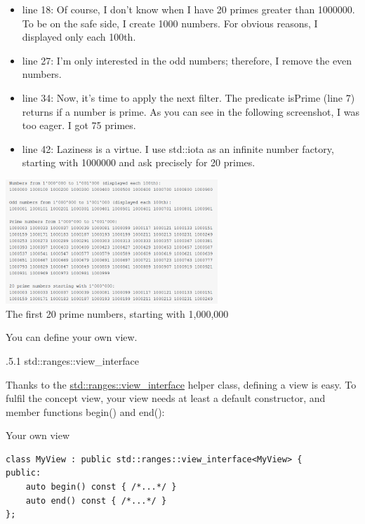 \begin{itemize}
\item 
line 18: Of course, I don’t know when I have 20 primes greater than 1000000. To be on the safe side, I create 1000 numbers. For obvious reasons, I displayed only each 100th.

\item 
line 27: I’m only interested in the odd numbers; therefore, I remove the even numbers.

\item 
line 34: Now, it’s time to apply the next filter. The predicate isPrime (line 7) returns if a number is prime. As you can see in the following screenshot, I was too eager. I got 75 primes.

\item 
line 42: Laziness is a virtue. I use std::iota as an infinite number factory, starting with 1000000 and ask precisely for 20 primes.
\end{itemize}

\begin{center}
\includegraphics[width=0.6\textwidth]{content/3/chapter5/images/1-2.png}\\
The first 20 prime numbers, starting with 1,000,000
\end{center}


You can define your own view.

.5.1\hspace{0.2cm} std::ranges::view\_interface

Thanks to the \href{https://en.cppreference.com/w/cpp/ranges/view_interface}{std::ranges::view\_interface} helper class, defining a view is easy. To fulfil the concept view, your view needs at least a default constructor, and member functions begin() and end():

\noindent
Your own view
\begin{lstlisting}[style=styleCXX]
class MyView : public std::ranges::view_interface<MyView> {
public:
	auto begin() const { /*...*/ }
	auto end() const { /*...*/ }
};
\end{lstlisting}

